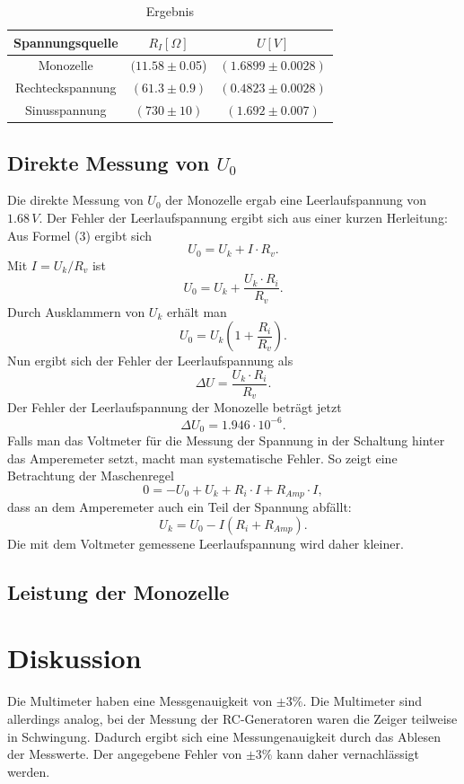 \documentclass[11pt]{article}
\begin{document}
 \begin{table}[h]
 \centering
 \caption{Ergebnis}
 \begin{tabular}{|c|c|c|}
  \hline
  Spannungsquelle & $R_I[\Omega]$ & $U[V]$ \\
  \hline
  Monozelle & $(11.58\pm$0.05) & $(1.6899\pm0.0028)$ \\
  Rechteckspannung & $(61.3\pm0.9)$& $(0.4823\pm0.0028)$ \\
  Sinusspannung & $(730\pm10)$ & $(1.692\pm0.007)$\\
  \hline
 \end{tabular}
 \label{Ergebnis}
 \end{table}

\subsection{Direkte Messung von $U_0$}
Die direkte Messung von $U_0$ der Monozelle ergab eine Leerlaufspannung von $1.68\, V$. Der Fehler der Leerlaufspannung ergibt sich aus einer kurzen Herleitung:\newline
Aus Formel (3) ergibt sich
\[ U_0 = U_k + I \cdot R_v. \]
Mit $I=U_k / R_v$ ist
\[ U_0 = U_k + \frac{U_k \cdot R_i}{R_v}.\]
Durch Ausklammern von $U_k$ erhält man
\[ U_0 = U_k \left( 1+\frac{R_i}{R_v}\right) .\]
Nun ergibt sich der Fehler der Leerlaufspannung als
\[ \Delta U = \frac{U_k \cdot R_i}{R_v}. \]
Der Fehler der Leerlaufspannung der Monozelle beträgt jetzt
\[ \Delta U_0 = 1.946 \cdot 10^{-6}.\]
\newline
Falls man das Voltmeter für die Messung der Spannung in der Schaltung hinter das Amperemeter setzt, macht man systematische Fehler. So zeigt eine Betrachtung der Maschenregel
\[ 0 = -U_0 + U_k + R_i \cdot I + R_{Amp} \cdot I ,\]
dass an dem Amperemeter auch ein Teil der Spannung abfällt:
\[ U_k = U_0 - I(R_i + R_{Amp}). \]
\newline
Die mit dem Voltmeter gemessene Leerlaufspannung wird daher kleiner.
\subsection{Leistung der Monozelle}

\section{Diskussion}
Die Multimeter haben eine Messgenauigkeit von $\pm 3 \%$. Die Multimeter sind allerdings analog, bei der Messung der RC-Generatoren waren die Zeiger teilweise in Schwingung. Dadurch ergibt sich eine Messungenauigkeit durch das Ablesen der Messwerte. Der angegebene Fehler von $\pm 3 \%$ kann daher vernachlässigt werden.
 
\end{document}
